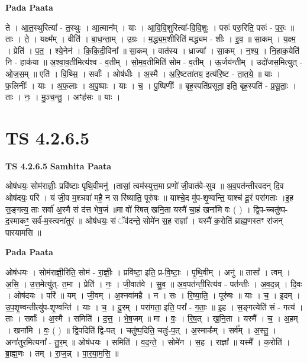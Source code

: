 \documentclass[17pt]{extarticle}
\begin{document}
\textbf{Pada Paata} \newline

ते । आ॒त॒स्थुरित्या᳚ - त॒स्थुः । आ॒त्मान᳚म् । याः । आ॒वि॒वि॒शुरित्या᳚-वि॒वि॒शुः । परुः॑ परु॒रिति॒ परुः॑ - प॒रुः॒ ॥ ताः । ते॒ । यक्ष्म᳚म् । वीति॑ । बा॒ध॒न्ता॒म् । उ॒ग्रः । म॒द्ध्य॒म॒शीरिति॑ मद्ध्यम - शीः । इ॒व॒ ॥ सा॒कम् । य॒क्ष्म॒ । प्रेति॑ । प॒त॒ । श्ये॒नेन॑ । कि॒कि॒दी॒विना᳚ ॥ सा॒कम् । वात॑स्य । ध्राज्या᳚ । सा॒कम् । न॒श्य॒ । नि॒हाक॒येति॑ नि - हाक॑या ॥ अ॒श्वा॒व॒तीमित्य॑श्व - व॒तीम् । सो॒म॒व॒तीमिति॑ सोम - व॒तीम् । ऊ॒र्जय॑न्तीम् । उदो॑जस॒मित्युत् - ओ॒ज॒स॒म् ॥ एति॑ । वि॒थ्सि॒ । सर्वाः᳚ । ओष॑धीः । अ॒स्मै । अ॒रि॒ष्टता॑तय॒ इत्य॑रि॒ष्ट - ता॒त॒ये॒ ॥ याः । फ॒लिनीः᳚ । याः । अ॒फ॒लाः । अ॒पु॒ष्पाः । याः । च॒ । पु॒ष्पिणीः᳚ ॥ बृह॒स्पति॑प्रसूता॒ इति॒ बृह॒स्पति॑ - प्र॒सू॒ताः॒ । ताः । नः॒ । मु॒ञ्च॒न्तु॒ । अꣳह॑सः ॥ याः ।  \newline





\section{ TS 4.2.6.5 }

\textbf{TS 4.2.6.5 } \newline
\textbf{Samhita Paata} \newline

ओष॑धयः॒ सोम॑राज्ञीः॒ प्रवि॑ष्टाः पृथि॒वीमनु॑ ।तासां॒ त्वम॑स्युत्त॒मा प्रणो॑ जी॒वात॑वे-सुव ॥ अ॒व॒पत॑न्तीरवदन् दि॒व ओष॑दयः॒ परि॑ । यं जी॒व म॒श्ञवा॑ महै॒ न स रि॑ष्याति॒ पूरु॑षः ॥ याश्चे॒द मु॑प-शृ॒ण्वन्ति॒ याश्च॑ दू॒रं परा॑गताः ।इ॒ह स॒ङ्गत्य॒ ताः सर्वा॑ अ॒स्मै सं द॑त्त भेष॒जं ॥मा वो॑ रिषत् खनि॒ता यस्मै॑ चा॒हं खना॑मि वः ( ) । द्वि॒प-च्चतु॑ष्प-द॒स्माकꣳ॒॒ सर्व॑-म॒स्त्वना॑तुरं ॥ ओष॑धयः॒ सं ॅव॑दन्ते॒ सोमे॑न स॒ह राज्ञा᳚ । यस्मै॑ क॒रोति॑ ब्राह्म॒णस्तꣳ रा॑जन् पारयामसि ॥ \newline

\textbf{Pada Paata} \newline

ओष॑धयः । सोम॑राज्ञी॒रिति॒ सोम॑ - रा॒ज्ञीः॒ । प्रवि॑ष्टा॒ इति॒ प्र-वि॒ष्टाः॒ । पृ॒थि॒वीम् । अनु॑ ॥ तासां᳚ । त्वम् । अ॒सि॒ । उ॒त्त॒मेत्यु॑त्- त॒मा । प्रेति॑ । नः॒ । जी॒वात॑वे । सु॒व॒ ॥ अ॒व॒पत॑न्ती॒रित्य॑व - पत॑न्तीः । अ॒व॒द॒न्न् । दि॒वः । ओष॑दयः । परि॑ ॥ यम् । जी॒वम् । अ॒श्नवा॑महै । न । सः । रि॒ष्या॒ति॒ । पूरु॑षः ॥ याः । च॒ । इ॒दम् । उ॒प॒शृ॒ण्वन्तीत्यु॑प-शृ॒ण्वन्ति॑ । याः । च॒ । दू॒रम् । परा॑गता॒ इति॒ परा᳚ - ग॒ताः॒ ॥ इ॒ह । स॒ङ्गत्येति॑ सं - गत्य॑ । ताः । सर्वाः᳚ । अ॒स्मै । समिति॑ । द॒त्त॒ । भे॒ष॒जम् ॥ मा । वः॒ । रि॒ष॒त् । ख॒नि॒ता । यस्मै᳚ । च॒ । अ॒हम् । खना॑मि । वः॒ ( ) ॥ द्वि॒पदिति॑ द्वि-पत् । चतु॑ष्प॒दिति॒ चतुः॑-प॒त् । अ॒स्माक᳚म् । सर्व᳚म् । अ॒स्तु॒ । अना॑तुर॒मित्यना᳚ - तु॒र॒म् ॥ ओष॑धयः । समिति॑ । व॒द॒न्ते॒ । सोमे॑न । स॒ह । राज्ञा᳚ ॥ यस्मै᳚ । क॒रोति॑ । ब्रा॒ह्म॒णः । तम् । रा॒ज॒न्न् । पा॒र॒या॒म॒सि॒ ॥  \newline
\end{document}
